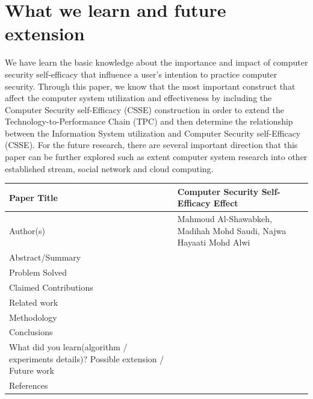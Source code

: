 \documentclass[a4paper, 12pt]{article}
\begin{document}
\section{What we learn and future extension}

We have learn the basic knowledge about the importance and impact of computer security self-efficacy that influence a user’s intention to practice computer security. Through this paper, we know that the most important construct that affect the computer system utilization and effectiveness by including the Computer Security self-Efficacy (CSSE) construction in order to extend the Technology-to-Performance Chain (TPC) and then determine the relationship between the Information System utilization and Computer Security self-Efficacy (CSSE).
For the future research, there are several important direction that this paper can be further explored such as extent computer system research into other established stream, social network and cloud computing.


{}


\begin{center}

\begin{tabular}{|m{5cm} | m{10cm} |}
\hline
Paper Title & Computer Security Self-Efficacy Effect \\ \hline

Author(s) & Mahmoud Al-Shawabkeh, Madihah Mohd Saudi, Najwa Hayaati Mohd Alwi\\ \hline

Abstract/Summary & \\ \hline 

Problem Solved & \\ \hline

Claimed Contributions & \\ \hline

Related work & \\ \hline

Methodology & \\ \hline

Conclusions & \\ \hline

What did you learn(algorithm / experiments details)? Possible extension / Future work & \\ \hline

References & \\ \hline
\end{tabular}

\end{center}
\end{document}
